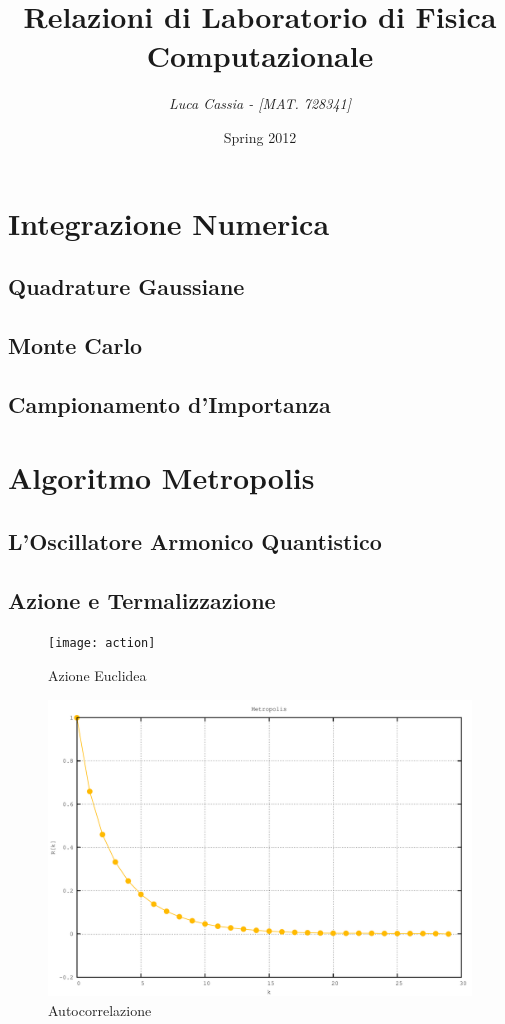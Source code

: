 \documentclass[a4paper,11pt]{report}
\title{\bfseries{\Huge{Relazioni di Laboratorio di Fisica Computazionale}}}
\author{\textit {Luca Cassia - [MAT. 728341]}}
\date{Spring 2012}
\begin{document}
\maketitle
\tableofcontents

\chapter{\huge Integrazione Numerica}

\section{Quadrature Gaussiane}
\section{Monte Carlo}
\section{Campionamento d'Importanza}

\chapter{\huge Algoritmo Metropolis}



\section{L'Oscillatore Armonico Quantistico}
\section{Azione e Termalizzazione}

\begin{figure}[htb]
\centering
\texttt{[image: action]}
\caption{Azione Euclidea}
\label{fig:action}
\end{figure}

\begin{figure}[htb]
\centering
\includegraphics[width=\textwidth]{autocorrelation}
\caption{Autocorrelazione}
\label{fig:autocorrelation}
\end{figure}
\end{document}

